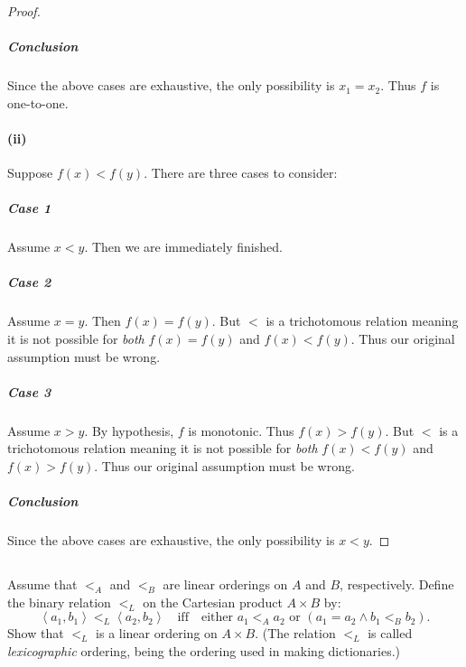 \documentclass{report}
\newcommand{\pair}[1]{\left< #1 \right>}
\begin{document}
\begin{proof}
    \subparagraph{Conclusion}%

      Since the above cases are exhaustive, the only possibility is $x_1 = x_2$.
      Thus $f$ is one-to-one.

  \paragraph{(ii)}%

    Suppose $f(x) < f(y)$.
    There are three cases to consider:

    \subparagraph{Case 1}%

      Assume $x < y$.
      Then we are immediately finished.

    \subparagraph{Case 2}%

      Assume $x = y$.
      Then $f(x) = f(y)$.
      But $<$ is a trichotomous relation meaning it is not possible for
        \textit{both} $f(x) = f(y)$ and $f(x) < f(y)$.
      Thus our original assumption must be wrong.

    \subparagraph{Case 3}%

      Assume $x > y$.
      By hypothesis, $f$ is monotonic.
      Thus $f(x) > f(y)$.
      But $<$ is a trichotomous relation meaning it is not possible for
        \textit{both} $f(x) < f(y)$ and $f(x) > f(y)$.
      Thus our original assumption must be wrong.

    \subparagraph{Conclusion}%

      Since the above cases are exhaustive, the only possibility is $x < y$.

\end{proof}

\subsection{}%

Assume that $<_A$ and $<_B$ are linear orderings on $A$ and $B$, respectively.
Define the binary relation $<_L$ on the Cartesian product $A \times B$ by:
  $$\pair{a_1, b_1} <_L \pair{a_2, b_2} \quad\text{iff}\quad
    \text{either } a_1 <_A a_2 \text{ or } (a_1 = a_2 \land b_1 <_B b_2).$$
Show that $<_L$ is a linear ordering on $A \times B$.
(The relation $<_L$ is called \textit{lexicographic} ordering, being the
  ordering used in making dictionaries.)
\end{document}
